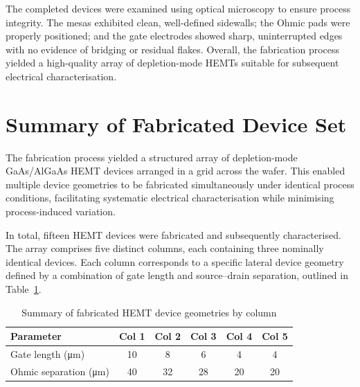 The completed devices were examined using optical microscopy to ensure process 
integrity. The mesas exhibited clean, well-defined sidewalls; the Ohmic pads 
were properly positioned; and the gate electrodes showed sharp, uninterrupted 
edges with no evidence of bridging or residual flakes. Overall, the 
fabrication process yielded a high-quality array of depletion-mode HEMTs 
suitable for subsequent electrical characterisation.

\vspace{2mm}

\section{Summary of Fabricated Device Set}

The fabrication process yielded a structured array
of depletion-mode GaAs/AlGaAs HEMT devices arranged in a grid across
the wafer. This enabled multiple device geometries to be fabricated
simultaneously under identical process conditions, facilitating systematic
electrical characterisation while minimising process-induced variation.

\vspace{2mm}

In total, fifteen HEMT devices were fabricated and subsequently characterised.
The array comprises five distinct columns, each containing three nominally
identical devices. Each column corresponds to a specific lateral device
geometry defined by a combination of gate length and source--drain separation, outlined in Table~{\ref{tab:device_geometries}}.

\vspace{2mm}

\begin{table}[htbp]
    \centering
    \caption{Summary of fabricated HEMT device geometries by column}
    \vspace{4pt}
    \label{tab:device_geometries}
    \small
    \begin{tabular}{l c c c c c}
        \hline
        \textbf{Parameter} 
        & \textbf{Col 1} 
        & \textbf{Col 2} 
        & \textbf{Col 3} 
        & \textbf{Col 4} 
        & \textbf{Col 5} \\
        \hline
        Gate length (\si{\micro\metre}) 
        & 10 & 8 & 6 & 4 & 4 \\
        Ohmic separation (\si{\micro\metre}) 
        & 40 & 32 & 28 & 20 & 20 \\
        \hline
    \end{tabular}
\end{table}

